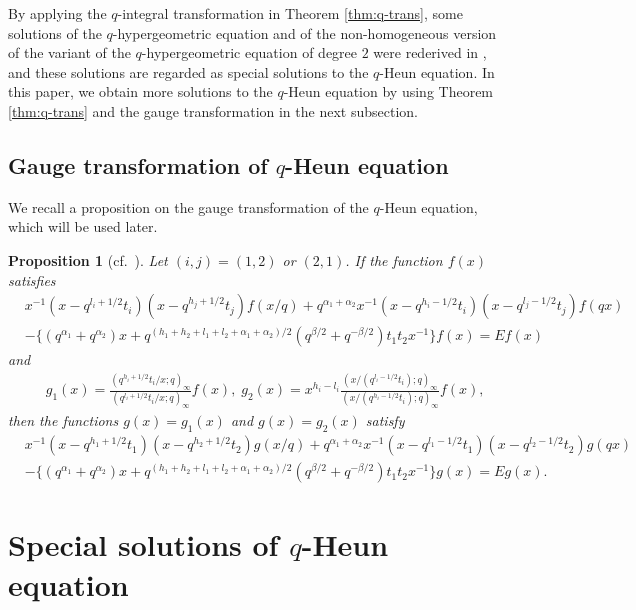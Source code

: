 \documentclass[12pt]{amsart}
\numberwithin{equation}{section}
\newtheorem{prop}[thm]{Proposition}
\theoremstyle{definition}
\theoremstyle{remark}
\begin{document}
By applying the $q$-integral transformation in Theorem \ref{thm:q-trans}, some solutions of the $q$-hypergeometric equation and of the non-homogeneous version of the variant of the $q$-hypergeometric equation of degree $2$ were rederived in \cite{TakK}, and these solutions are regarded as special solutions to the $q$-Heun equation.
In this paper, we obtain more solutions to the $q$-Heun equation by using Theorem \ref{thm:q-trans} and the gauge transformation in the next subsection. 

\subsection{Gauge transformation of $q$-Heun equation}
We recall a proposition on the gauge transformation of the $q$-Heun equation, which will be used later.
\begin{prop} [{cf.\ \cite[Proposition 5.2]{TakK}}] \label{prop:GT}
Let $(i,j) = (1,2)$ or $(2,1)$. 
If the function $f(x) $ satisfies
\begin{align}
& x^{-1} (x-q^{l_i + 1/2} t_i) (x-q^{h_j +1/2} t_j) f(x/q) +  q^{\alpha _1 +\alpha _2} x^{-1} (x - q^{h_i -1/2} t_i) (x - q^{l_j -1/2} t_j) f(qx)  \nonumber \\
& -\{ (q^{\alpha _1} +q^{\alpha _2} ) x  + q^{(h_1 +h_2 + l_1 +l_2 +\alpha _1 +\alpha _2 )/2} ( q^{\beta/2} + q^{-\beta/2} ) t_1 t_2 x^{-1} \} f(x) = E f(x)  \nonumber 
\end{align}
and
\begin{align}
& g_1(x) = \frac{(q^{h_i + 1/2} t_i/x; q)_{\infty }}{(q^{l_i + 1/2} t_i/x; q)_{\infty }} f(x) , \; g_2 (x) =  x ^{h_i -l_i} \frac{(x/(q^{l_i - 1/2} t_i); q)_{\infty }}{(x/(q^{h_i - 1/2} t_i) ; q)_{\infty }} f(x),  \nonumber 
\end{align}
then the functions $g(x)= g_1 (x)$ and $g(x)= g_2 (x)$ satisfy
\begin{align}
& x^{-1} (x-q^{h_1 + 1/2} t_1) (x-q^{h_2 +1/2} t_2) g(x/q) +  q^{\alpha _1 +\alpha _2} x^{-1} (x - q^{l_1 -1/2} t_1) (x - q^{l_2 -1/2} t_2) g(qx)  \nonumber \\
& -\{ (q^{\alpha _1} +q^{\alpha _2} ) x  + q^{(h_1 +h_2 + l_1 +l_2 +\alpha _1 +\alpha _2 )/2} ( q^{\beta/2} + q^{-\beta/2} ) t_1 t_2 x^{-1} \} g(x) = E g(x) . \nonumber 
\end{align}
\end{prop}

\section{Special solutions of $q$-Heun equation} \label{sec:q-Int}
\end{document}

